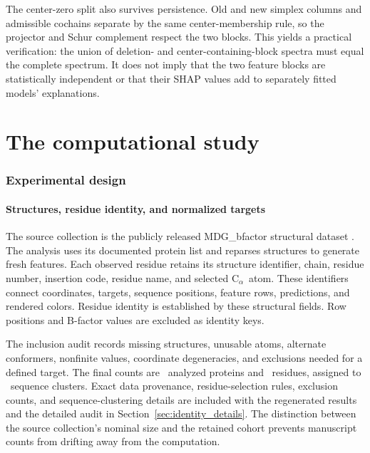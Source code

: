 \documentclass[11pt]{article}
\newcommand{\calpha}{C$_\alpha$}
\begin{document}
The center-zero split also survives persistence. Old and new simplex columns and admissible cochains separate by the same center-membership rule, so the projector and Schur complement respect the two blocks. This yields a practical verification: the union of deletion- and center-containing-block spectra must equal the complete spectrum. It does not imply that the two feature blocks are statistically independent or that their SHAP values add to separately fitted models' explanations.


\FloatBarrier\clearpage\part{The computational study}

\section{Experimental design}
\subsection{Structures, residue identity, and normalized targets}
The source collection is the publicly released MDG\_bfactor structural dataset \citep{feng2025}. The analysis uses its documented protein list and reparses structures to generate fresh features. Each observed residue retains its structure identifier, chain, residue number, insertion code, residue name, and selected \calpha\ atom. These identifiers connect coordinates, targets, sequence positions, feature rows, predictions, and rendered colors. Residue identity is established by these structural fields. Row positions and B-factor values are excluded as identity keys.

The inclusion audit records missing structures, unusable atoms, alternate conformers, nonfinite values, coordinate degeneracies, and exclusions needed for a defined target. The final counts are \StudyProteins\ analyzed proteins and \StudyResidues\ residues, assigned to \StudyClusters\ sequence clusters. Exact data provenance, residue-selection rules, exclusion counts, and sequence-clustering details are included with the regenerated results and the detailed audit in Section~\ref{sec:identity_details}. The distinction between the source collection's nominal size and the retained cohort prevents manuscript counts from drifting away from the computation.
\end{document}
